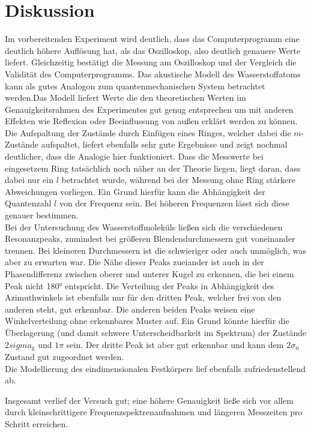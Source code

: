 \section{Diskussion}
Im vorbereitenden Experiment wird deutlich, dass das Computerprogramm eine deutlich höhere
Auflösung hat, als das Oszilloskop, also deutlich genauere Werte liefert. Gleichzeitig
bestätigt die Messung am Oszilloskop und der Vergleich die Validität des Computerprogramms.
Das akustische Modell des Wasserstoffatoms kann als gutes Analogon zum quantenmechanischen 
System betrachtet werden.Das Modell liefert Werte die 
den theoretischen Werten im Genauigkeitsrahmen des Experimentes gut genug entsprechen um mit
anderen Effekten wie Reflexion oder Beeinflussung von außen erklärt werden zu können.
Die Aufspaltung der Zustände durch Einfügen eines Ringes, welcher dabei die $m$-Zustände aufspaltet,
liefert ebenfalls sehr gute Ergebnisse
und zeigt nochmal deutlicher, dass die Analogie hier funktioniert. Dass die Messwerte bei 
eingesetzem Ring tatsächlich noch näher an der Theorie liegen, liegt daran, dass dabei nur 
ein $l$ betrachtet wurde, während bei der Messung ohne Ring stärkere Abweichungen vorliegen.
Ein Grund hierfür kann die Abhängigkeit der Quantenzahl $l$ von der Frequenz sein. Bei höheren
Frequenzen lässt sich diese genauer bestimmen.\\
Bei der Untersuchung des Wasserstoffmoleküls ließen sich die verschiedenen Resonanzpeaks,
zumindest bei größeren Blendendurchmessern gut voneinander trennen. Bei kleineren Durchmessern
ist die schwieriger oder auch unmöglich, was aber zu erwarten war. 
Die Nähe dieser Peaks zueiander ist auch in der Phasendifferenz zwischen oberer und unterer
Kugel zu erkennen, die bei einem Peak nicht 180$°$ entspricht. Die Verteilung der Peaks 
in Abhängigkeit des Azimuthwinkels ist ebenfalls nur für den dritten Peak, welcher frei von den anderen steht,
gut erkennbar. Die anderen beiden Peaks weisen eine Winkelverteilung ohne erkennbares Muster
auf. Ein Grund könnte hierfür die Überlagerung (und damit schwere Unterscheidbarkeit im Spektrum)
der Zustände $2 sigma_{\text{g}}$ und $1 \pi$ sein. Der dritte Peak ist aber gut erkennbar und kann 
dem $2 \sigma_{\text{u}}$ Zustand gut zugeordnet werden. \\
Die Modellierung des eindimensionalen Festkörpers lief ebenfalls zufriedenstellend ab.

Insgesamt verlief der Versuch gut; eine höhere Genauigkeit ließe sich vor allem durch 
kleinschrittigere Frequenzspektrenaufnahmen und längeren Messzeiten pro Schritt erreichen.
